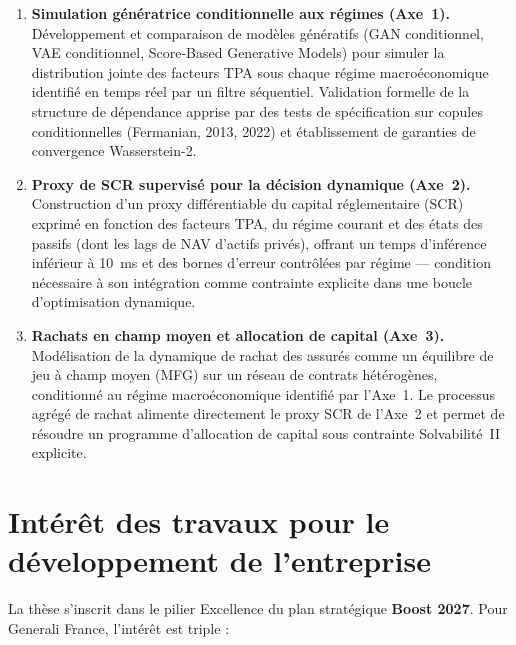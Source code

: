 \documentclass[10pt,a4paper]{article}
\begin{document}
\begin{enumerate}[leftmargin=2em,itemsep=4pt]
  \item \textbf{Simulation génératrice conditionnelle aux régimes (Axe~1).}
        Développement et comparaison de modèles génératifs
        (GAN conditionnel, VAE conditionnel, Score-Based Generative Models)
        pour simuler la distribution jointe des facteurs TPA sous chaque régime
        macroéconomique identifié en temps réel par un filtre séquentiel.
        Validation formelle de la structure de dépendance apprise par des tests
        de spécification sur copules conditionnelles (Fermanian, 2013, 2022)
        et établissement de garanties de convergence Wasserstein-2.

  \item \textbf{Proxy de SCR supervisé pour la décision dynamique (Axe~2).}
        Construction d'un proxy différentiable du capital réglementaire (SCR)
        exprimé en fonction des facteurs TPA, du régime courant et des états
        des passifs (dont les lags de NAV d'actifs privés), offrant un temps
        d'inférence inférieur à 10~ms et des bornes d'erreur contrôlées
        par régime --- condition nécessaire à son intégration comme contrainte
        explicite dans une boucle d'optimisation dynamique.

  \item \textbf{Rachats en champ moyen et allocation de capital (Axe~3).}
        Modélisation de la dynamique de rachat des assurés comme un équilibre
        de jeu à champ moyen (MFG) sur un réseau de contrats hétérogènes,
        conditionné au régime macroéconomique identifié par l'Axe~1.
        Le processus agrégé de rachat alimente directement le proxy SCR de l'Axe~2
        et permet de résoudre un programme d'allocation de capital sous contrainte
        Solvabilité~II explicite.
\end{enumerate}

\section{Intérêt des travaux pour le développement de l'entreprise}

La thèse s'inscrit dans le pilier \og{}Excellence\fg{} du plan stratégique
\textbf{Boost 2027}.  Pour Generali France, l'intérêt est triple :
\end{document}
